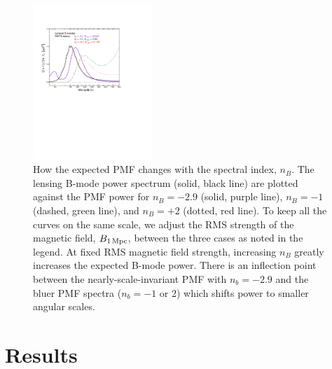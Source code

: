 \documentclass[apj]{emulateapj}
\newcommand{\bpmf}{\ensuremath{B_{\rm 1\,Mpc}}}
\begin{document}
\begin{figure}[htb]\centering
\includegraphics[width=0.4\textwidth,clip,trim={1.5cm 12.cm 5cm 4cm}]{pmf_templates_nb.pdf}
  \caption[CMB polarization from PMFs with different spectral indices]{ \label{fig:pmf-nb}
  How the expected PMF changes with the spectral index, $n_B$. 
  The lensing B-mode power spectrum (solid, black line) are plotted against the PMF power for $n_B=-2.9$ (solid, purple line), $n_B=-1$ (dashed, green line), and $n_B=+2$ (dotted, red line). 
  To keep all the curves on the same scale, we adjust the RMS strength of the magnetic field, \bpmf{}, between the three cases as noted in the legend. 
  At fixed RMS magnetic field strength, increasing $n_B$ greatly increases the expected B-mode power. 
  There is an inflection point between the nearly-scale-invariant PMF with $n_b=-2.9$ and the bluer PMF spectra ($n_b=-1$ or 2) which shifts power to smaller angular scales. 
  }
\end{figure}
 
\section{Results}
\label{sec:results}
\end{document}
